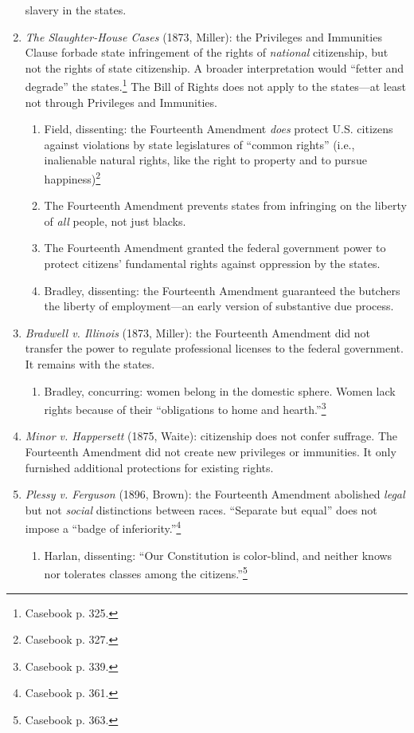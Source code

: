 \begin{enumerate}
    slavery in the states.
    \item \emph{The Slaughter-House Cases} (1873, Miller): the Privileges and 
    Immunities Clause forbade state infringement of the rights of 
    \emph{national} citizenship, but not the rights of state citizenship. A 
    broader interpretation would ``fetter and degrade'' the 
    states.\footnote{Casebook p. 325.} The Bill of Rights does not apply to 
    the states---at least not through Privileges and Immunities.
    \begin{enumerate}
        \item Field, dissenting: the Fourteenth Amendment \emph{does} protect 
        U.S. citizens against violations by state legislatures of ``common 
        rights'' (i.e., inalienable natural rights, like the right to property 
        and to pursue happiness)\footnote{Casebook p. 327.}
        \item The Fourteenth Amendment prevents states from infringing on the 
        liberty of \emph{all} people, not just blacks.
        \item The Fourteenth Amendment granted the federal government power to 
        protect citizens' fundamental rights against oppression by the states.
        \item Bradley, dissenting: the Fourteenth Amendment guaranteed the 
        butchers the liberty of employment---an early version of substantive 
        due process.
    \end{enumerate}
    \item \emph{Bradwell v. Illinois} (1873, Miller): the Fourteenth Amendment 
    did not transfer the power to regulate professional licenses to the 
    federal government. It remains with the states.
    \begin{enumerate}
        \item Bradley, concurring: women belong in the domestic sphere. Women 
        lack rights because of their ``obligations to home and 
        hearth.''\footnote{Casebook p. 339.}
    \end{enumerate}
    \item \emph{Minor v. Happersett} (1875, Waite): citizenship does not 
    confer suffrage. The Fourteenth Amendment did not create new privileges or 
    immunities. It only furnished additional protections for existing rights.
    \item \emph{Plessy v. Ferguson} (1896, Brown): the Fourteenth Amendment 
    abolished \emph{legal} but not \emph{social} distinctions between races.  
    ``Separate but equal'' does not impose a ``badge of 
    inferiority.''\footnote{Casebook p. 361.}
    \begin{enumerate}
        \item Harlan, dissenting: ``Our Constitution is color-blind, 
        and neither knows nor tolerates classes among the 
        citizens.''\footnote{Casebook p. 363.}
    \end{enumerate}
\end{enumerate}

